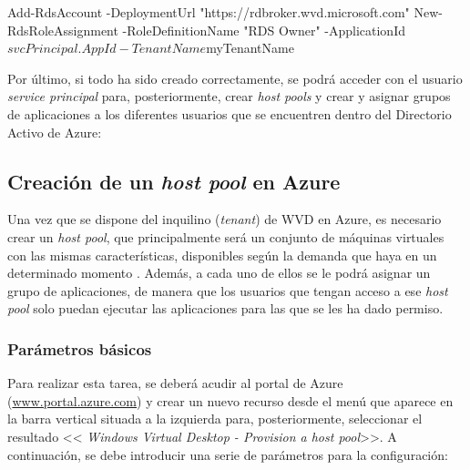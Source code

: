 \begin{console}
    Add-RdsAccount -DeploymentUrl "https://rdbroker.wvd.microsoft.com"
    New-RdsRoleAssignment -RoleDefinitionName "RDS Owner" -ApplicationId $svcPrincipal.AppId -TenantName $myTenantName
\end{console} %

Por último, si todo ha sido creado correctamente, se podrá acceder con el usuario \textit{service principal} para, posteriormente, crear \textit{host pools} y crear y asignar grupos de aplicaciones a los diferentes usuarios que se encuentren dentro del Directorio Activo de Azure:


\clearpage

\subsection{Creación de un \textit{host pool} en Azure}
Una vez que se dispone del inquilino (\textit{tenant}) de \acs{WVD} en Azure, es necesario crear un \textit{host pool}, que principalmente será un conjunto de máquinas virtuales con las mismas características, disponibles según la demanda que haya en un determinado momento \cite{microsofttutohostpool}. Además, a cada uno de ellos se le podrá asignar un grupo de aplicaciones, de manera que los usuarios que tengan acceso a ese \textit{host pool} solo puedan ejecutar las aplicaciones para las que se les ha dado permiso.

\subsubsection{Parámetros básicos}
Para realizar esta tarea, se deberá acudir al portal de Azure (\url{www.portal.azure.com}) y crear un nuevo recurso desde el menú que aparece en la barra vertical situada a la izquierda para, posteriormente, seleccionar el resultado <<\textit{
Windows Virtual Desktop - Provision a host pool}>>. A continuación, se debe introducir una serie de parámetros para la configuración:

